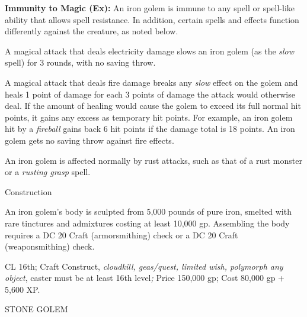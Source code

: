 \documentclass{article}
\begin{document}
\textbf{Immunity to Magic (Ex):} An iron golem is immune to any spell or spell-like 
ability that allows spell resistance. In addition, certain spells and effects function 
differently against the creature, as noted below.

A magical attack that deals electricity damage slows an iron golem (as the \textit{slow 
}spell) for 3 rounds, with no saving throw.

A magical attack that deals fire damage breaks any \textit{slow }effect on the 
golem and heals 1 point of damage for each 3 points of damage the attack would 
otherwise deal. If the amount of healing would cause the golem to exceed its full 
normal hit points, it gains any excess as temporary hit points. For example, an 
iron golem hit by a \textit{fireball }gains back 6 hit points if the damage total 
is 18 points. An iron golem gets no saving throw against fire effects.

An iron golem is affected normally by rust attacks, such as that of a rust monster 
or a \textit{rusting grasp }spell.

Construction

An iron golem's body is sculpted from 5,000 pounds of pure iron, smelted with rare 
tinctures and admixtures costing at least 10,000 gp. Assembling the body requires 
a DC 20 Craft (armorsmithing) check or a DC 20 Craft (weaponsmithing) check.

CL 16th; Craft Construct, \textit{cloudkill, geas/quest, limited wish, polymorph 
any object}, caster must be at least 16th level\textit{; }Price 150,000 gp; Cost 
80,000 gp + 5,600 XP.

\vspace{12pt}
STONE GOLEM
\end{document}
